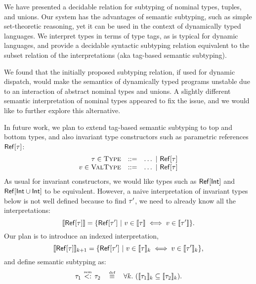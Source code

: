 We have presented a decidable relation for subtyping of
nominal types, tuples, and unions.
Our system has the advantages of semantic subtyping, 
such as simple set-theoretic reasoning, 
yet it can be used in the context of dynamically typed languages.
We interpret types in terms of type tags, 
as is typical for dynamic languages,
and provide a decidable syntactic subtyping relation %
equivalent to the subset relation of the interpretations
(aka tag-based semantic subtyping).

We found that the initially proposed subtyping relation, 
if used for dynamic dispatch, 
would make the semantics of dynamically typed programs unstable
due to an interaction of abstract nominal types and unions.
A slightly different semantic interpretation of nominal types 
appeared to fix the issue, 
and we would like to further explore this alternative.

In future work, we plan to extend tag-based semantic subtyping 
to top and bottom types, 
and also invariant type constructors such as 
parametric references $\mathsf{Ref}[\tau]$: %
\[
\begin{array}{rcl}
\tau \in \textsc{Type}   &::=& \ldots ~\vert~ \mathsf{Ref}[\tau]\\
v \in \textsc{ValType} &::=& \ldots ~\vert~ \mathsf{Ref}[\tau]
\end{array}
\]
As usual for invariant constructors, 
we would like types such as $\mathsf{Ref}[\mathsf{Int}]$
and $\mathsf{Ref}[\mathsf{Int} \cup \mathsf{Int}]$ to be equivalent.
However, a naive interpretation of invariant types below
is not well defined because to find $\tau'$, 
we need to already know all the interpretations:
\[
\llbracket \mathsf{Ref}[\tau] \rrbracket = 
\{ \mathsf{Ref}[\tau'] ~\vert~ v \in \llbracket \tau \rrbracket \iff v \in \llbracket \tau' \rrbracket \}.
\]
Our plan is to introduce an indexed interpretation,
\[
\llbracket \mathsf{Ref}[\tau] \rrbracket_{k+1} = \{ \mathsf{Ref}[\tau'] 
    ~\vert~ v \in \llbracket \tau \rrbracket_k \iff v \in \llbracket \tau' \rrbracket_k \},
\]
and define semantic subtyping as:
\[
\bjtruesemsub{\ty_1}{\ty_2} \quad \defsign \quad
\forall k.\ (\interpty{\ty_1}_k \subseteq \interpty{\ty_2}_k).
\]

